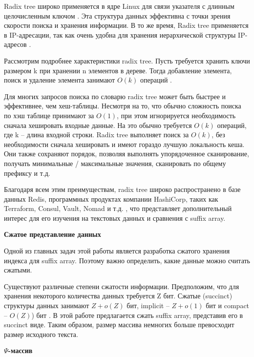 Radix tree широко применяется в ядре Linux для связи указателя с длинным целочисленным ключом \cite{Linux2018}.
Эта структура данных эффективна с точки зрения скорости поиска и хранения информации.
В то же время, Radix tree применяется в IP-адресации, так как очень удобна для хранения
иерархической структуры IP-адресов \cite{Radix2019}.

Рассмотрим подробнее характеристики radix tree. Пусть требуется хранить ключи размером k
при хранении n элементов в дереве. Тогда добавление элемента, поиск и удаление элемента
занимают $O(k)$ операций \cite{leis2013adaptive}.

Для многих запросов поиска по словарю radix tree может быть быстрее и эффективнее, чем хеш-таблицы.
Несмотря на то, что обычно сложность поиска по хэш таблице принимают за $O(1)$,
при этом игнорируется необходимость сначала хешировать входные данные.
На это обычно требуется $O(k)$ операций, где k -- длина входной строки.
Radix tree выполняет поиск за $O(k)$, без необходимости сначала хешировать и имеют гораздо лучшую локальность кеша.
Они также сохраняют порядок, позволяя выполнять упорядоченное сканирование,
получать минимальные / максимальные значения, сканировать по общему префиксу и т.д.

Благодаря всем этим преимуществам, radix tree широко распространено в базе данных Redis, программных продуктах
компании HashiCorp, таких как Terraform, Consul, Vault, Nomad и т.д. \cite{Redis2018},
что представляет дополнительный интерес для его изучения на текстовых данных и сравнения с suffix array.

\textbf{Сжатое представление данных}

Одной из главных задач этой работы является разработка сжатого хранения индекса для suffix array.
Поэтому важно определить, какие данные можно считать сжатыми.

Существуют различные степени сжатости информации.
Предположим, что для хранения некоторого количества данных требуется Z бит.
Сжатые (succinct) структуры данных занимают \(Z + o(Z)\) бит, implicit -- \(Z + o(1)\) бит и
compact -- \(O(Z)\)) бит \cite{huo2014practical}. В этой работе предлагается сжать suffix array, представив его в succinct виде.
Таким образом, размер массива немногих больше превосходит размер исходного текста.

\textbf{$\Psi$-массив}

